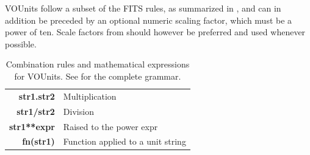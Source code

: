 \documentclass[11pt,notitlepage,onecolumn]{ivoa}
\newcommand{\unit}[1]{\textbf{\textsf{\color{orange}#1}}}
\begin{document}
VOUnits follow a subset of the FITS rules,
as summarized in ,
and can in addition be preceded by an optional numeric scaling factor,
which must be a power of ten.
Scale factors from  should however be
preferred and used whenever possible.

\begin{table}%
\begin{center}
\def\arraystretch{1.2}
\begin{tabular}{|r|l|}
\hline
\unit{str1.str2} & Multiplication \\
\unit{str1/str2} & Division \\
\unit{str1**expr} & Raised to the power expr \\
\unit{fn(str1)} & Function applied to a unit string\\
\hline
\end{tabular}
\end{center}
 \caption[Combination rules and mathematical expressions for VOUnits]
{\label{tab:VOUnitCombine}Combination rules and mathematical expressions for VOUnits.
See  for the complete grammar.}
\end{table}
\end{document}
